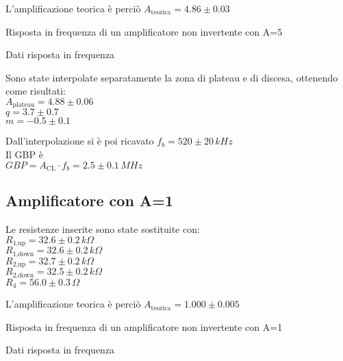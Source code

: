 L'amplificazione teorica è perciò
$A_\textrm{teorica} = 4.86 \pm 0.03$

\begin{grafico}
 \centering 
  \resizebox{\textwidth}{!}{%
  
  }%
 \caption{Risposta in frequenza di un amplificatore non invertente con A=5} 
 \label{gr:amp_noninv_A5.tex} 
\end{grafico}

\begin{tabella}
 \centering
   
 \caption{Dati risposta in frequenza}
 \label{tab:tab_noninv_A5.tex}
\end{tabella}

Sono state interpolate separatamente la zona di plateau e di discesa, ottenendo come risultati:\\
$A_\textrm{plateau}=4.88 \pm 0.06$\\
$q = 3.7 \pm 0.7$\\
$m = -0.5 \pm 0.1$

Dall'interpolazione si è poi ricavato 
$f_b= 520 \pm 20 \,kHz $\\
Il GBP è\\
$GBP=A_\textrm{CL} \cdot f_b = 2.5 \pm 0.1 \,MHz$


\subsection{Amplificatore con A=1}
Le resistenze inserite sono state sostituite con:\\
$R_\textrm{1,up}=32.6 \pm 0.2 \,k\Omega $\\ %
$R_\textrm{1,down}=32.6 \pm 0.2\,k\Omega$\\ %
$R_\textrm{2,up}=32.7 \pm 0.2\,k\Omega$\\ %
$R_\textrm{2,down}=32.5 \pm 0.2\,k\Omega$\\
$R_4=56.0 \pm 0.3\,\Omega$

L'amplificazione teorica è perciò
$A_\textrm{teorica} = 1.000 \pm 0.005$

\begin{grafico}
 \centering 
  \resizebox{\textwidth}{!}{%
  
 }%
 \caption{Risposta in frequenza di un amplificatore non invertente con A=1} 
 \label{gr:amp_noninv_A1.tex} 
\end{grafico}

\begin{tabella}
 \centering
  
 \caption{Dati risposta in frequenza}
 \label{tab:tab_noninv_A1.tex}
\end{tabella}

